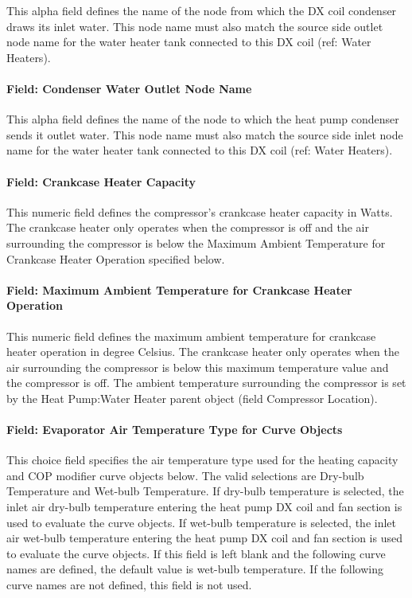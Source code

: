 This alpha field defines the name of the node from which the DX coil condenser draws its inlet water. This node name must also match the source side outlet node name for the water heater tank connected to this DX coil (ref: Water Heaters).

\paragraph{Field: Condenser Water Outlet Node Name}\label{field-condenser-water-outlet-node-name}

This alpha field defines the name of the node to which the heat pump condenser sends it outlet water. This node name must also match the source side inlet node name for the water heater tank connected to this DX coil (ref: Water Heaters).

\paragraph{Field: Crankcase Heater Capacity}\label{field-crankcase-heater-capacity-7}

This numeric field defines the compressor's crankcase heater capacity in Watts. The crankcase heater only operates when the compressor is off and the air surrounding the compressor is below the Maximum Ambient Temperature for Crankcase Heater Operation specified below.

\paragraph{Field: Maximum Ambient Temperature for Crankcase Heater Operation}\label{field-maximum-ambient-temperature-for-crankcase-heater-operation}

This numeric field defines the maximum ambient temperature for crankcase heater operation in degree Celsius. The crankcase heater only operates when the air surrounding the compressor is below this maximum temperature value and the compressor is off. The ambient temperature surrounding the compressor is set by the Heat Pump:Water Heater parent object (field Compressor Location).

\paragraph{Field: Evaporator Air Temperature Type for Curve Objects}\label{field-evaporator-air-temperature-type-for-curve-objects}

This choice field specifies the air temperature type used for the heating capacity and COP modifier curve objects below. The valid selections are Dry-bulb Temperature and Wet-bulb Temperature. If dry-bulb temperature is selected, the inlet air dry-bulb temperature entering the heat pump DX coil and fan section is used to evaluate the curve objects. If wet-bulb temperature is selected, the inlet air wet-bulb temperature entering the heat pump DX coil and fan section is used to evaluate the curve objects. If this field is left blank and the following curve names are defined, the default value is wet-bulb temperature. If the following curve names are not defined, this field is not used.

